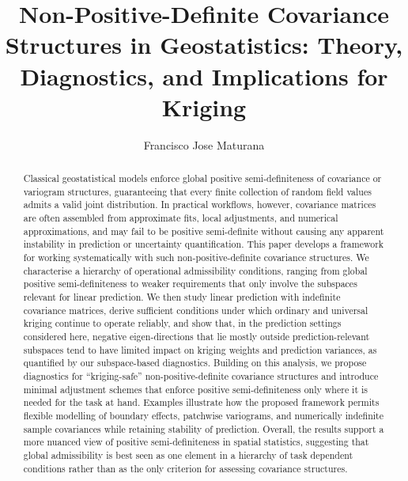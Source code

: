 \documentclass[smallextended]{svjour3}
\newcommand{\1}{\mathbf{1}}
\begin{document}
	
	\title{Non-Positive-Definite Covariance Structures in Geostatistics: Theory, Diagnostics, and Implications for Kriging}
\author{
	Francisco Jose Maturana
}
\date{}

\maketitle
	
	\begin{abstract}
		Classical geostatistical models enforce global positive semi-definiteness of covariance or variogram structures, guaranteeing that every finite collection of random field values admits a valid joint distribution. 
		In practical workflows, however, covariance matrices are often assembled from approximate fits, local adjustments, and numerical approximations, and may fail to be positive semi-definite without causing any apparent instability in prediction or uncertainty quantification. 
		This paper develops a framework for working systematically with such non-positive-definite covariance structures.
		We characterise a hierarchy of operational admissibility conditions, ranging from global positive semi-definiteness to weaker requirements that only involve the subspaces relevant for linear prediction.
		We then study linear prediction with indefinite covariance matrices, derive sufficient conditions under which ordinary and universal kriging continue to operate reliably, and show that, in the prediction settings considered here, negative eigen-directions that lie mostly outside prediction-relevant subspaces tend to have limited impact on kriging weights and prediction variances, as quantified by our subspace-based diagnostics.
		Building on this analysis, we propose diagnostics for ``kriging-safe'' non-positive-definite covariance structures and introduce minimal adjustment schemes that enforce positive semi-definiteness only where it is needed for the task at hand.
		Examples illustrate how the proposed framework permits flexible modelling of boundary effects, patchwise variograms, and numerically indefinite sample covariances while retaining stability of prediction.
		Overall, the results support a more nuanced view of positive semi-definiteness in spatial statistics, suggesting that global admissibility is best seen as one element in a hierarchy of task dependent conditions rather than as the only criterion for assessing covariance structures.
	\end{abstract}
	
\end{document}
